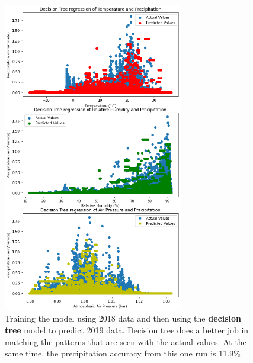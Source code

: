 \documentclass[11pt]{report}
\begin{document}
\begin{figure}[t]
	\centering
	\includegraphics[width=0.7\textwidth]{Figures/ML_DT_reg.png}
	\caption[ML Decision Tree regression run] {\label{ML_DT}Training the
          model using 2018 data and then using the \textbf{decision tree}
          model to predict 2019 data. Decision tree does a better job in
          matching the patterns that are seen with the actual values. At the
          same time, the precipitation accuracy from this one run is 11.9\%}
\end{figure}
\end{document}
